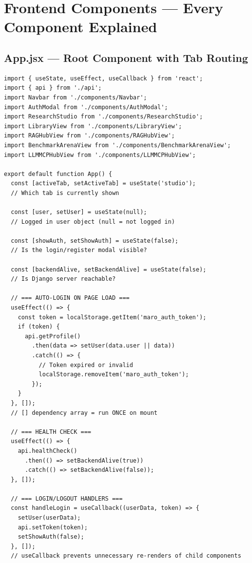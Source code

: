 \documentclass[11pt,a4paper,twoside]{report}
\begin{document}

\chapter{Frontend Components --- Every Component Explained}

\section{App.jsx --- Root Component with Tab Routing}

\begin{lstlisting}[style=jsstyle,caption={App.jsx --- Application Shell}]
import { useState, useEffect, useCallback } from 'react';
import { api } from './api';
import Navbar from './components/Navbar';
import AuthModal from './components/AuthModal';
import ResearchStudio from './components/ResearchStudio';
import LibraryView from './components/LibraryView';
import RAGHubView from './components/RAGHubView';
import BenchmarkArenaView from './components/BenchmarkArenaView';
import LLMMCPHubView from './components/LLMMCPHubView';

export default function App() {
  const [activeTab, setActiveTab] = useState('studio');
  // Which tab is currently shown

  const [user, setUser] = useState(null);
  // Logged in user object (null = not logged in)

  const [showAuth, setShowAuth] = useState(false);
  // Is the login/register modal visible?

  const [backendAlive, setBackendAlive] = useState(false);
  // Is Django server reachable?

  // === AUTO-LOGIN ON PAGE LOAD ===
  useEffect(() => {
    const token = localStorage.getItem('maro_auth_token');
    if (token) {
      api.getProfile()
        .then(data => setUser(data.user || data))
        .catch(() => {
          // Token expired or invalid
          localStorage.removeItem('maro_auth_token');
        });
    }
  }, []);
  // [] dependency array = run ONCE on mount

  // === HEALTH CHECK ===
  useEffect(() => {
    api.healthCheck()
      .then(() => setBackendAlive(true))
      .catch(() => setBackendAlive(false));
  }, []);

  // === LOGIN/LOGOUT HANDLERS ===
  const handleLogin = useCallback((userData, token) => {
    setUser(userData);
    api.setToken(token);
    setShowAuth(false);
  }, []);
  // useCallback prevents unnecessary re-renders of child components


\end{lstlisting}
\end{document}
